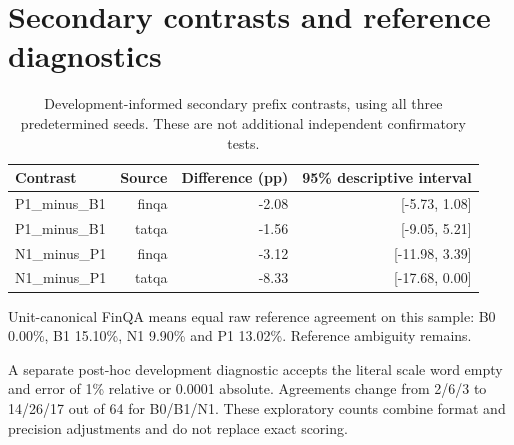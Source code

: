 \documentclass[11pt,a4paper]{article}
\begin{document}
\section{Secondary contrasts and reference diagnostics}
\begin{table}[htbp]\centering\small\begin{tabular}{lrrr}\toprule
Contrast & Source & Difference (pp) & 95\% descriptive interval \\ \midrule
P1\_minus\_B1 & finqa & -2.08 & [-5.73, 1.08] \\
P1\_minus\_B1 & tatqa & -1.56 & [-9.05, 5.21] \\
N1\_minus\_P1 & finqa & -3.12 & [-11.98, 3.39] \\
N1\_minus\_P1 & tatqa & -8.33 & [-17.68, 0.00] \\
\bottomrule\end{tabular}\caption{Development-informed secondary prefix contrasts, using all three predetermined seeds. These are not additional independent confirmatory tests.}\label{tab:secondary}\end{table}
Unit-canonical FinQA means equal raw reference agreement on this sample: B0 0.00\%, B1 15.10\%, N1 9.90\% and P1 13.02\%. Reference ambiguity remains.

A separate post-hoc development diagnostic accepts the literal scale word empty and error of 1\% relative or 0.0001 absolute. Agreements change from 2/6/3 to 14/26/17 out of 64 for B0/B1/N1. These exploratory counts combine format and precision adjustments and do not replace exact scoring.

\clearpage
\end{document}
